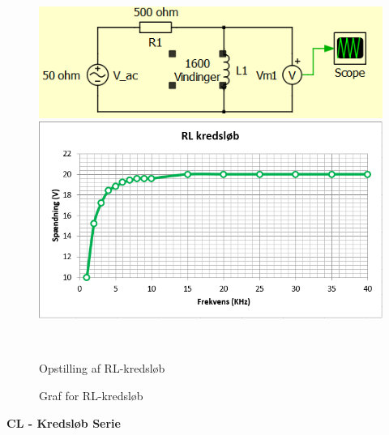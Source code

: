 \begin{figure}[H]
	\centering
	\begin{minipage}[b]{0.48\textwidth}
	\centering
	\includegraphics[width=1\textwidth]{Vildledning/Schematics/kredslb/RL} %
	\end{minipage}
	\hfill
	\begin{minipage}[b]{0.48\textwidth}
	\centering
	\includegraphics[width=1\textwidth]{Setup/Graf2} %
	\end{minipage}
	\\ %
	\begin{minipage}[t]{0.48\textwidth}
	\caption{Opstilling af RL-kredsløb} %
	\end{minipage}
	\hfill
	\begin{minipage}[t]{0.48\textwidth}
	\caption{Graf for RL-kredsløb} %
	\end{minipage}
\end{figure}

\textbf{CL - Kredsløb Serie}

